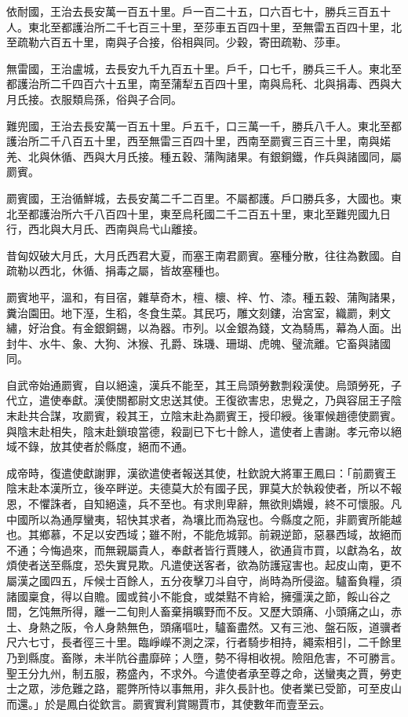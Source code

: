 \begin{pinyinscope}
依耐國，王治去長安萬一百五十里。戶一百二十五，口六百七十，勝兵三百五十人。東北至都護治所二千七百三十里，至莎車五百四十里，至無雷五百四十里，北至疏勒六百五十里，南與子合接，俗相與同。少穀，寄田疏勒、莎車。

無雷國，王治盧城，去長安九千九百五十里。戶千，口七千，勝兵三千人。東北至都護治所二千四百六十五里，南至蒲犁五百四十里，南與烏秅、北與捐毒、西與大月氏接。衣服類烏孫，俗與子合同。

難兜國，王治去長安萬一百五十里。戶五千，口三萬一千，勝兵八千人。東北至都護治所二千八百五十里，西至無雷三百四十里，西南至罽賓三百三十里，南與婼羌、北與休循、西與大月氏接。種五穀、蒲陶諸果。有銀銅鐵，作兵與諸國同，屬罽賓。

罽賓國，王治循鮮城，去長安萬二千二百里。不屬都護。戶口勝兵多，大國也。東北至都護治所六千八百四十里，東至烏秅國二千二百五十里，東北至難兜國九日行，西北與大月氏、西南與烏弋山離接。

昔匈奴破大月氏，大月氏西君大夏，而塞王南君罽賓。塞種分散，往往為數國。自疏勒以西北，休循、捐毒之屬，皆故塞種也。

罽賓地平，溫和，有目宿，雜草奇木，檀、櫰、梓、竹、漆。種五穀、蒲陶諸果，糞治園田。地下溼，生稻，冬食生菜。其民巧，雕文刻鏤，治宮室，織罽，剌文繡，好治食。有金銀銅錫，以為器。市列。以金銀為錢，文為騎馬，幕為人面。出封牛、水牛、象、大狗、沐猴、孔爵、珠璣、珊瑚、虎魄、璧流離。它畜與諸國同。

自武帝始通罽賓，自以絕遠，漢兵不能至，其王烏頭勞數剽殺漢使。烏頭勞死，子代立，遣使奉獻。漢使關都尉文忠送其使。王復欲害忠，忠覺之，乃與容屈王子陰末赴共合謀，攻罽賓，殺其王，立陰末赴為罽賓王，授印綬。後軍候趙德使罽賓。與陰末赴相失，陰末赴鎖琅當德，殺副已下七十餘人，遣使者上書謝。孝元帝以絕域不錄，放其使者於縣度，絕而不通。

成帝時，復遣使獻謝罪，漢欲遣使者報送其使，杜欽說大將軍王鳳曰：「前罽賓王陰末赴本漢所立，後卒畔逆。夫德莫大於有國子民，罪莫大於執殺使者，所以不報恩，不懼誅者，自知絕遠，兵不至也。有求則卑辭，無欲則嬌嫚，終不可懷服。凡中國所以為通厚蠻夷，轺快其求者，為壤比而為寇也。今縣度之阨，非罽賓所能越也。其鄉慕，不足以安西域；雖不附，不能危城郭。前親逆節，惡暴西域，故絕而不通；今悔過來，而無親屬貴人，奉獻者皆行賈賤人，欲通貨市買，以獻為名，故煩使者送至縣度，恐失實見欺。凡遣使送客者，欲為防護寇害也。起皮山南，更不屬漢之國四五，斥候士百餘人，五分夜擊刀斗自守，尚時為所侵盜。驢畜負糧，須諸國稟食，得以自贍。國或貧小不能食，或桀黠不肯給，擁彊漢之節，餒山谷之間，乞饨無所得，離一二旬則人畜棄捐曠野而不反。又歷大頭痛、小頭痛之山，赤土、身熱之阪，令人身熱無色，頭痛嘔吐，驢畜盡然。又有三池、盤石阪，道骥者尺六七寸，長者徑三十里。臨崢嶸不測之深，行者騎步相持，繩索相引，二千餘里乃到縣度。畜隊，未半阬谷盡靡碎；人墮，勢不得相收視。險阻危害，不可勝言。聖王分九州，制五服，務盛內，不求外。今遣使者承至尊之命，送蠻夷之賈，勞吏士之眾，涉危難之路，罷弊所恃以事無用，非久長計也。使者業已受節，可至皮山而還。」於是鳳白從欽言。罽賓實利賞賜賈市，其使數年而壹至云。


\end{pinyinscope}
